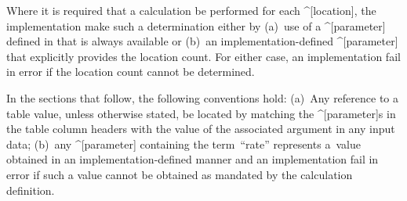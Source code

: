 Where it is required that a calculation be performed for each ^[location], the
implementation \shall make such a determination either by (a)~use of a
^[parameter] defined in  that is always available or (b)~an
implementation-defined ^[parameter] that explicitly provides the location count.
For either case, an implementation \must fail in error if the location count
cannot be determined.

In the sections that follow, the following conventions \shall hold: (a)~Any
reference to a table value, unless otherwise stated, \shall be located by
matching the ^[parameter]s in the table column headers with the value of the
associated argument in any input data; (b)~any ^[parameter] containing the
term~``rate'' represents a~value obtained in an implementation-defined manner
and an implementation \must fail in error if such a value cannot be obtained as
mandated by the calculation definition.

